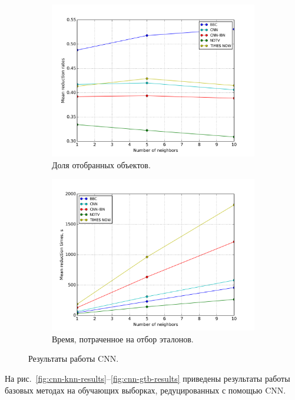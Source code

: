 \begin{figure}[h!]
    \centering
	\begin{subfigure}{0.45\textwidth}
		\includegraphics[width=\textwidth]{images/cnn-stats.png}
		\caption{Доля отобранных объектов.}
	\end{subfigure}
	\begin{subfigure}{0.45\textwidth}
		\includegraphics[width=\textwidth]{images/cnn-TimeStats.png}
		\caption{Время, потраченное на отбор эталонов.}
	\end{subfigure}
	\caption{Результаты работы CNN.}\label{fig:cnn-stats}
\end{figure}

На рис.~\ref{fig:cnn-knn-results}--\ref{fig:cnn-gtb-results} приведены результаты работы базовых методах на обучающих выборках, редуцированных с помощью CNN. 

